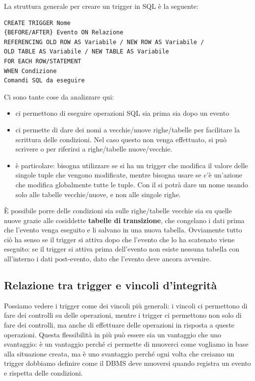 \documentclass[11pt, a4paper, titlepage, oneside]{scrbook}
\begin{document}
La struttura generale per creare un trigger in SQL è la seguente:

\begin{lstlisting}
CREATE TRIGGER Nome
{BEFORE/AFTER} Evento ON Relazione
REFERENCING OLD ROW AS Variabile / NEW ROW AS Variabile /
OLD TABLE AS Variabile / NEW TABLE AS Variabile
FOR EACH ROW/STATEMENT
WHEN Condizione
Comandi SQL da eseguire
\end{lstlisting}

Ci sono tante cose da analizzare qui:
\begin{itemize}
    \item {} ci permettono di eseguire operazioni SQL sia prima sia dopo un evento
    \item {} ci permette di dare dei nomi a vecchie/nuove righe/tabelle per facilitare la scrittura delle condizioni. Nel caso questo non venga effettuato, si può scrivere  o  per riferirsi a righe/tabelle nuove/vecchie.
    \item {} è particolare: bisogna utilizzare  se si ha un trigger che modifica il valore delle singole tuple che vengono modificate, mentre bisogna usare  se c'è un'azione che modifica globalmente tutte le tuple.
    \NB Con il  si potrà dare un nome usando  solo alle tabelle vecchie/nuove, e non alle singole righe.
\end{itemize}

È possibile porre delle condizioni sia sulle righe/tabelle vecchie sia su quelle nuove grazie alle cosiddette \textbf{tabelle di transizione}, che congelano i dati prima che l'evento venga eseguito e li salvano in una nuova tabella. Ovviamente tutto ciò ha senso se il trigger si attiva dopo che l'evento che lo ha scatenato viene eseguito: se il trigger si attiva prima dell'evento non esiste nessuna tabella con all'interno i dati post-evento, dato che l'evento deve ancora avvenire.

\subsection{Relazione tra trigger e vincoli d'integrità}

Possiamo vedere i trigger come dei vincoli più generali: i vincoli ci permettono di fare dei controlli su delle operazioni, mentre i trigger ci permettono non solo di fare dei controlli, ma anche di effettuare delle operazioni in risposta a queste operazioni. Questa flessibilità in più può essere sia un vantaggio che uno svantaggio: è un vantaggio perché ci permette di muoverci come vogliamo in base alla situazione creata, ma è uno svantaggio perché ogni volta che creiamo un trigger dobbiamo definire come il DBMS deve muoversi quando registra un evento e rispetta delle condizioni. 
\end{document}
